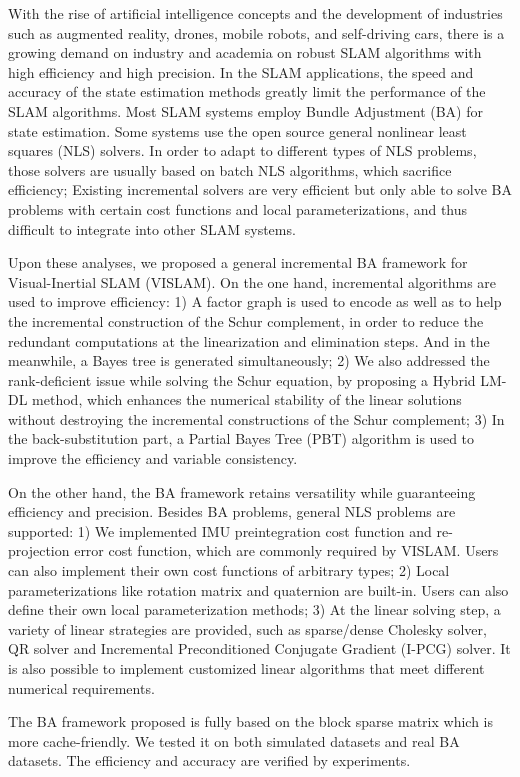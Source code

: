 \begin{englishabstract}
With the rise of artificial intelligence concepts and the development of industries such as augmented reality, drones, mobile robots, and self-driving cars, there is a growing demand on industry and academia on robust SLAM algorithms with high efficiency and high precision. In the SLAM applications, the speed and accuracy of the state estimation methods greatly limit the performance of the SLAM algorithms. Most SLAM systems employ Bundle Adjustment (BA) for state estimation. Some systems use the open source general nonlinear least squares (NLS) solvers. In order to adapt to different types of NLS problems, those solvers are usually based on batch NLS algorithms, which sacrifice efficiency; Existing incremental solvers are very efficient but only able to solve BA problems with certain cost functions and local parameterizations, and thus difficult to integrate into other SLAM systems.

Upon these analyses, we proposed a general incremental BA framework for Visual-Inertial SLAM (VISLAM). On the one hand, incremental algorithms are used to improve efficiency: 1) A factor graph is used to encode as well as to help the incremental construction of the Schur complement, in order to reduce the redundant computations at the linearization and elimination steps. And in the meanwhile, a Bayes tree is generated simultaneously; 2) We also addressed the rank-deficient issue while solving the Schur equation, by proposing a Hybrid LM-DL method, which enhances the numerical stability of the linear solutions without destroying the incremental constructions of the Schur complement; 3) In the back-substitution part, a Partial Bayes Tree (PBT) algorithm is used to improve the efficiency and variable consistency.

On the other hand, the BA framework retains versatility while guaranteeing efficiency and precision. Besides BA problems, general NLS problems are supported: 1) We implemented IMU preintegration cost function and re-projection error cost function, which are commonly required by VISLAM. Users can also implement their own cost functions of arbitrary types; 2) Local parameterizations like rotation matrix and quaternion are built-in. Users can also define their own local parameterization methods; 3) At the linear solving step, a variety of linear strategies are provided, such as sparse/dense Cholesky solver, QR solver and Incremental Preconditioned Conjugate Gradient (I-PCG) solver. It is also possible to implement customized linear algorithms that meet different numerical requirements.

The BA framework proposed is fully based on the block sparse matrix which is more cache-friendly. We tested it on both simulated datasets and real BA datasets. The efficiency and accuracy are verified by experiments.

\end{englishabstract}


